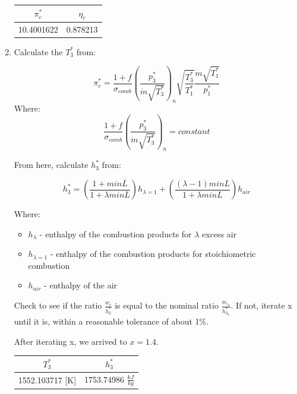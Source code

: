 \documentclass[titlepage]{article}
\begin{document}
\begin{enumerate}
    \begin{center}
      \begin{tabular}{|c|c|}
        \hline
        $\pi_{c}^{*}$ & $\eta_{c}$ \\
        \hline
        10.4001622 & 0.878213 \\
        \hline
      \end{tabular}
    \end{center}
    \item Calculate the $T_{3}^{*}$ from:
    
    \begin{equation}
      \pi_{c}^{*} = \frac{1+f}{\sigma_{comb}} \left( \frac{p_{3}^{*}}{\dot{m}\sqrt{T_{3}^{*}}} \right)_{n}
      \sqrt{\frac{T_{3}^{*}}{T_{1}^{*}}} \frac{\dot{m}\sqrt{T_{1}^{*}}}{p_{1}^{*}}
    \end{equation}
    Where:
    \begin{equation}
      \frac{1+f}{\sigma_{comb}} \left( \frac{p_{3}^{*}}{\dot{m}\sqrt{T_{3}^{*}}} \right)_{n} = constant
    \end{equation}
    
    From here, calculate $h_{3}^{*}$ from:
  
    \begin{equation}
      h_{3}^{*} = \left(\frac{1+minL}{1+\lambda minL}\right) h_{\lambda =1} + \left(\frac{(\lambda -1) minL}{1+\lambda minL}\right) h_{air}
    \end{equation}
  
    Where:
    \begin{itemize}
      \item $h_{\lambda}$ - enthalpy of the combustion products for $\lambda$ excess air
      \item $h_{\lambda = 1}$ - enthalpy of the combustion products for stoichiometric combustion
      \item $h_{air}$ - enthalpy of the air
    \end{itemize}
  
    Check to see if the ratio $\frac{w_{c}}{h_{3}^{*}}$ is equal to the nominal ratio
    $\frac{w_{c_{n}}}{h_{3_{n}}^{*}}$. If not, iterate x until it is, within a reasonable tolerance of about 1\%.
  
    \vspace{0.5cm}
  
    After iterating x, we arrived to $x = 1.4$.
  
    \begin{center}
      \begin{tabular}{|c|c|}
        \hline
        $T_{3}^{*}$ & $h_{3}^{*}$ \\
        \hline
        1552.103717 [K] & 1753.74986 $\frac{kJ}{kg}$ \\
        \hline
      \end{tabular}
    \end{center}
  

\end{enumerate}
\end{document}
